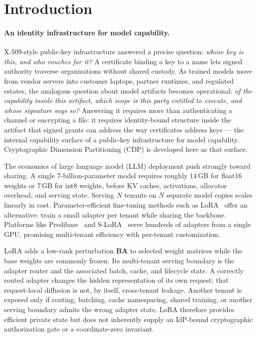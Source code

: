 \documentclass[11pt,a4paper]{article}
\begin{document}
\section{Introduction}
\label{sec:intro}

\paragraph{An identity infrastructure for model capability.}
X.509-style public-key infrastructure answered a precise question:
\emph{whose key is this, and who vouches for it?}  A certificate
binding a key to a name lets signed authority traverse organizations
without shared custody.  As trained models move from vendor servers
into customer laptops, partner runtimes, and regulated estates, the
analogous question about model artifacts becomes operational: \emph{of
the capability inside this artifact, which scope is this party
entitled to execute, and whose signature says so?}  Answering it
requires more than authenticating a channel or encrypting a file: it
requires identity-bound structure inside the artifact that signed
grants can address the way certificates address keys --- the internal
capability surface of a public-key infrastructure for model capability.
Cryptographic Dimension Partitioning (CDP) is developed here as that surface.

The economics of large language model (LLM) deployment push
strongly toward sharing.  A single 7-billion-parameter model
requires roughly 14\,GB for float16 weights or 7\,GB for int8 weights,
before KV caches, activations, allocator overhead, and serving state.
Serving $N$ tenants on $N$ separate model copies
scales linearly in cost.  Parameter-efficient fine-tuning methods
such as LoRA~\citep{hu2022lora} offer an alternative: train a
small adapter per tenant while sharing the backbone.  Platforms
like Predibase~\citep{predibase2024lorax} and
S-LoRA~\citep{sheng2024slora} serve hundreds of adapters from a
single GPU, promising multi-tenant efficiency with per-tenant
customization.

LoRA adds a low-rank perturbation $\mathbf{B}\mathbf{A}$ to selected
weight matrices while the base weights are commonly frozen.  Its
multi-tenant serving boundary is the adapter router and the associated
batch, cache, and lifecycle state.  A correctly routed adapter changes
the hidden representation of its own request; that request-local
diffusion is not, by itself, cross-tenant leakage.  Another tenant is
exposed only if routing, batching, cache namespacing, shared training,
or another serving boundary admits the wrong adapter state.  LoRA
therefore provides efficient private state but does not inherently
supply an IdP-bound cryptographic authorization gate or a
coordinate-zero invariant.
\end{document}
